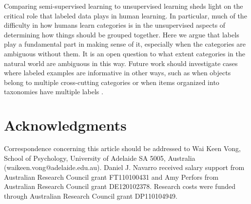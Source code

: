 \documentclass[a4paper, doc]{apa6}
\begin{document}
Comparing semi-supervised learning to unsupervised learning sheds light on the critical role that labeled data plays in human learning. In particular, much of the difficulty in how humans learn categories is in the unsupervised aspects of determining how things should be grouped together. Here we argue that labels play a fundamental part in making sense of it, especially when the categories are ambiguous without them. It is an open question to what extent categories in the natural world are ambiguous in this way. Future work should investigate cases where labeled examples are informative in other ways, such as when objects belong to multiple cross-cutting categories \cite{shafto2011probabilistic} or when items organized into taxonomies have multiple labels \cite{canini2011nonparametric}.

\section{Acknowledgments}

Correspondence concerning this article should be addressed to Wai Keen Vong, School of Psychology, University of Adelaide SA 5005, Australia (waikeen.vong@adelaide.edu.au). Daniel J. Navarro received salary support from Australian Research Council grant FT110100431 and Amy Perfors from Australian Research Council grant DE120102378. Research costs were funded through Australian Research Council grant DP110104949.

%
%
\end{document}
